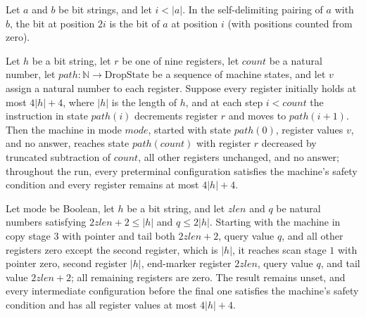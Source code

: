 \begin{lemma}
\label{Complexity.drop_first_read}
\leanok
{}
Let $a$ and $b$ be bit strings, and let $i<|a|$. In the self-delimiting pairing of $a$
with $b$, the bit at position $2i$ is the bit of $a$ at position $i$ (with positions
counted from zero).
\end{lemma}

\begin{lemma}
\label{Complexity.drop_decrement_run}
\leanok
{}
Let $h$ be a bit string, let $r$ be one of nine registers, let $count$ be a natural
number, let $path : \mathbb{N} \to \mathrm{DropState}$ be a sequence of machine states,
and let $v$ assign a natural number to each register. Suppose every register initially
holds at most $4|h|+4$, where $|h|$ is the length of $h$, and at each step $i<count$ the
instruction in state $path(i)$ decrements register $r$ and moves to $path(i+1)$. Then
the machine in mode $mode$, started with state $path(0)$, register values $v$, and no
answer, reaches state $path(count)$ with register $r$ decreased by truncated subtraction
of $count$, all other registers unchanged, and no answer; throughout the run, every
preterminal configuration satisfies the machine's safety condition and every register
remains at most $4|h|+4$.
\end{lemma}

\begin{lemma}
\label{Complexity.drop_z_prepare}
\leanok
{}
Let $\mathrm{mode}$ be Boolean, let $h$ be a bit string, and let $zlen$ and $q$ be
natural numbers satisfying $2zlen+2\le |h|$ and $q\le 2|h|$. Starting with the machine
in copy stage $3$ with pointer and tail both $2zlen+2$, query value $q$, and all other
registers zero except the second register, which is $|h|$, it reaches scan stage $1$
with pointer zero, second register $|h|$, end-marker register $2zlen$, query value $q$,
and tail value $2zlen+2$; all remaining registers are zero. The result remains unset,
and every intermediate configuration before the final one satisfies the machine's safety
condition and has all register values at most $4|h|+4$.
\end{lemma}

